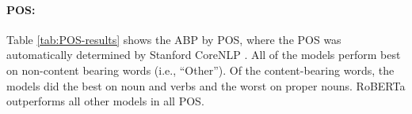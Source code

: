 \documentclass[11pt]{article}
\begin{document}
\paragraph{POS:} Table \ref{tab:POS-results} shows the ABP by POS, where the POS was automatically determined by Stanford CoreNLP \cite{manning2014corenlp}. All of the models perform best on non-content bearing words (i.e., ``Other'').  Of the content-bearing words, the models did the best on noun and verbs and the worst on proper nouns.  RoBERTa outperforms all other models in all POS.

\begin{table}[t]
\centering
{}
\caption{\label{tab:POS-results} Accuracy of the RoBERTa, BERT, XLNet, and GPT-2 with and without context by part-of-speech on the test data.}
\end{table}


\end{document}

